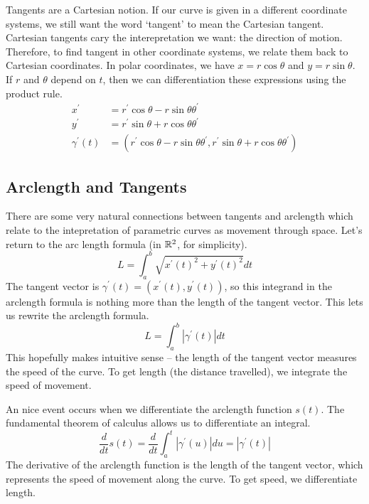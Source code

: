 \documentclass[fleqn,letterpaper]{report}
\begin{document}
Tangents are a Cartesian notion. If our curve is given in a
different coordinate systems, we still want the word `tangent'
to mean the Cartesian tangent. Cartesian tangents cary the
interepretation we want: the direction of motion. Therefore,
to find tangent in other coordinate systems, we relate them
back to Cartesian coordinates. In polar coordinates, we have
$x = r \cos \theta$ and $y = r \sin \theta$. If $r$ and
$\theta$ depend on $t$, then we can differentiation these
expressions using the product rule. 
\begin{align*}
x^\prime & = r^\prime \cos \theta - r \sin \theta \theta^\prime
\\
y^\prime & = r^\prime \sin \theta + r \cos \theta \theta^\prime 
\\
\gamma^\prime(t) & = (r^\prime \cos \theta - r \sin \theta
\theta^\prime, r^\prime \sin \theta + r \cos \theta
\theta^\prime)
\end{align*}

\subsection{Arclength and Tangents}
\label{arclength-and-tangents}

There are some very natural connections between tangents and
arclength which relate to the intepretation of parametric
curves as movement through space.  Let's return to the arc
length formula (in $\mathbb{R}^2$, for simplicity).
\begin{equation*}
L = \int_a^b \sqrt{x^\prime(t)^2 + y^\prime(t)^2} dt
\end{equation*}
The tangent vector is $\gamma^\prime(t) =
(x^\prime(t), y^\prime(t))$, so this integrand in the
arclength formula is nothing more
than the length of the tangent vector. This lets us rewrite
the arclength formula.
\begin{equation*}
L = \int_a^b |\gamma^\prime(t)| dt
\end{equation*}
This hopefully makes intuitive sense -- the length of the tangent
vector measures the speed of the curve. To get length (the
distance travelled), we integrate the speed of movement.

An nice event occurs when we differentiate the arclength
function $s(t)$. The fundamental theorem of calculus allows us
to differentiate an integral.
\begin{equation*}
\frac{d}{dt} s(t) = \frac{d}{dt} \int_a^t |\gamma^\prime(u)| du
= |\gamma^\prime (t)|
\end{equation*}
The derivative of the arclength function is the length of
the tangent vector, which represents the speed of movement
along the curve. To get speed, we differentiate length.
\end{document}
